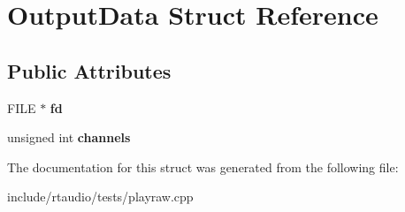 \hypertarget{struct_output_data}{}\section{Output\+Data Struct Reference}
\label{struct_output_data}
\subsection*{Public Attributes}
\begin{DoxyCompactItemize}
\item 
F\+I\+LE $\ast$ {\bfseries fd}\hypertarget{struct_output_data_a4828a74db4c374ce053d3c0b456d2d75}{}\label{struct_output_data_a4828a74db4c374ce053d3c0b456d2d75}

\item 
unsigned int {\bfseries channels}\hypertarget{struct_output_data_a92c2706eab522709af0ec57c4f1e5478}{}\label{struct_output_data_a92c2706eab522709af0ec57c4f1e5478}

\end{DoxyCompactItemize}


The documentation for this struct was generated from the following file\+:\begin{DoxyCompactItemize}
\item 
include/rtaudio/tests/playraw.\+cpp\end{DoxyCompactItemize}
